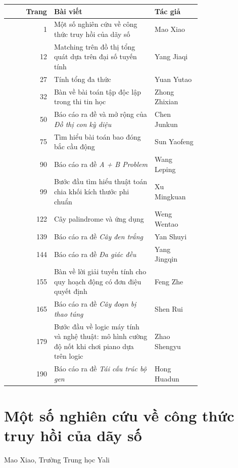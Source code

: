 \documentclass[11pt]{article}
\begin{document}
\begin{center}
\small
\begin{tabular}{r p{0.52\linewidth} p{0.24\linewidth}}
\textbf{Trang} & \textbf{Bài viết} & \textbf{Tác giả} \\
\hline
1 & Một số nghiên cứu về công thức truy hồi của dãy số & Mao Xiao \\
12 & Matching trên đồ thị tổng quát dựa trên đại số tuyến tính & Yang Jiaqi \\
27 & Tính tổng đa thức & Yuan Yutao \\
32 & Bàn về bài toán tập độc lập trong thi tin học & Zhong Zhixian \\
50 & Báo cáo ra đề và mở rộng của \emph{Đồ thị con kỳ diệu} & Chen Junkun \\
75 & Tìm hiểu bài toán bao đóng bắc cầu động & Sun Yaofeng \\
90 & Báo cáo ra đề \emph{A + B Problem} & Wang Leping \\
99 & Bước đầu tìm hiểu thuật toán chia khối kích thước phi chuẩn & Xu Mingkuan \\
122 & Cây palindrome và ứng dụng & Weng Wentao \\
139 & Báo cáo ra đề \emph{Cây đen trắng} & Yan Shuyi \\
144 & Báo cáo ra đề \emph{Đa giác đều} & Yang Jingqin \\
155 & Bàn về lời giải tuyến tính cho quy hoạch động có đơn điệu quyết định & Feng Zhe \\
165 & Báo cáo ra đề \emph{Cây đoạn bị thao túng} & Shen Rui \\
179 & Bước đầu về logic máy tính và nghệ thuật: mô hình cường độ nốt khi chơi piano dựa trên logic & Zhao Shengyu \\
190 & Báo cáo ra đề \emph{Tái cấu trúc bộ gen} & Hong Huadun \\
\end{tabular}
\end{center}

\section{Một số nghiên cứu về công thức truy hồi của dãy số}

\begin{center}
Mao Xiao, Trường Trung học Yali
\end{center}

\renewcommand{\abstractname}{Tóm tắt}
\begin{abstract}
Bài viết này là luận văn đội tuyển quốc gia tin học Trung Quốc năm 2017 của
tác giả. Trong bài, tác giả trước hết giới thiệu đa thức truy hồi, sau đó
giới thiệu thuật toán Berlekamp--Massey, rồi trình bày triển vọng ứng dụng của
chúng trong thi tin học, gồm đếm công thức truy hồi và tìm đa thức đặc trưng
của một số ma trận thưa.
\end{abstract}
\end{document}
